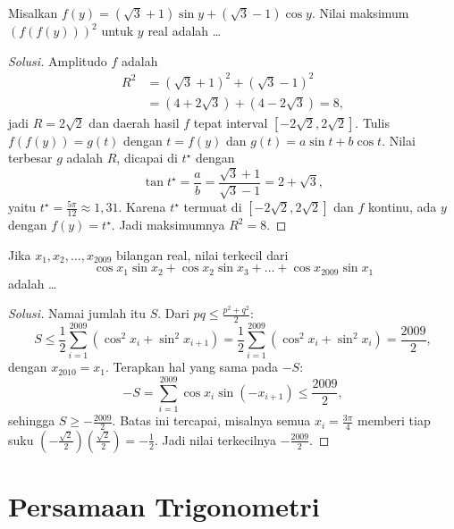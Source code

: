 \documentclass[12pt]{scrartcl}
\begin{document}
\begin{example}[OSK 2009]
Misalkan $f(y) = (\sqrt{3}+1)\sin y + (\sqrt{3}-1)\cos y$.
Nilai maksimum $(f(f(y)))^2$ untuk $y$ real adalah \dots
\end{example}
\begin{proof}[Solusi]
Amplitudo $f$ adalah
\begin{align*}
R^2 &= (\sqrt{3}+1)^2 + (\sqrt{3}-1)^2 \\
&= (4+2\sqrt{3}) + (4-2\sqrt{3}) = 8,
\end{align*}
jadi $R = 2\sqrt{2}$ dan daerah hasil $f$ tepat interval $[-2\sqrt{2}, 2\sqrt{2}]$.
Tulis $f(f(y)) = g(t)$ dengan $t = f(y)$ dan $g(t) = a\sin t + b\cos t$.
Nilai terbesar $g$ adalah $R$, dicapai di $t^{\star}$ dengan
\[ \tan t^{\star} = \frac{a}{b} = \frac{\sqrt{3}+1}{\sqrt{3}-1} = 2+\sqrt{3}, \]
yaitu $t^{\star} = \frac{5\pi}{12} \approx 1{,}31$.
Karena $t^{\star}$ termuat di $[-2\sqrt{2}, 2\sqrt{2}]$ dan $f$ kontinu,
ada $y$ dengan $f(y) = t^{\star}$. Jadi maksimumnya $R^2 = 8$.
\end{proof}

\begin{example}[OSP 2009]
Jika $x_1, x_2, \dots, x_{2009}$ bilangan real, nilai terkecil dari
\[ \cos x_1 \sin x_2 + \cos x_2 \sin x_3 + \dots + \cos x_{2009} \sin x_1 \]
adalah \dots
\end{example}
\begin{proof}[Solusi]
Namai jumlah itu $S$. Dari $pq \le \frac{p^2+q^2}{2}$:
\[ S \le \frac{1}{2}\sum_{i=1}^{2009}(\cos^2 x_i + \sin^2 x_{i+1})
= \frac{1}{2}\sum_{i=1}^{2009}(\cos^2 x_i + \sin^2 x_i)
= \frac{2009}{2}, \]
dengan $x_{2010} = x_1$. Terapkan hal yang sama pada $-S$:
\[ -S = \sum_{i=1}^{2009}\cos x_i \sin(-x_{i+1}) \le \frac{2009}{2}, \]
sehingga $S \ge -\frac{2009}{2}$.
Batas ini tercapai, misalnya semua $x_i = \frac{3\pi}{4}$ memberi tiap suku
$\left(-\frac{\sqrt{2}}{2}\right)\left(\frac{\sqrt{2}}{2}\right) = -\frac12$.
Jadi nilai terkecilnya $-\frac{2009}{2}$.
\end{proof}

\section{Persamaan Trigonometri}
\end{document}
